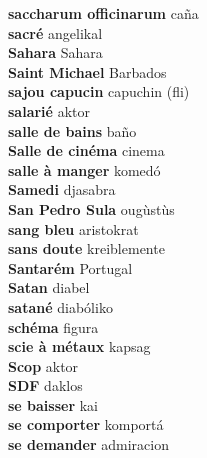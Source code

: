 \textbf{ saccharum officinarum  } caña \\
\textbf{ sacré  } angelikal \\
\textbf{ Sahara  } Sahara \\
\textbf{ Saint Michael  } Barbados \\
\textbf{ sajou capucin  } capuchin (fli) \\
\textbf{ salarié  } aktor \\
\textbf{ salle de bains  } baño \\
\textbf{ Salle de cinéma  } cinema \\
\textbf{ salle à manger  } komedó \\
\textbf{ Samedi  } djasabra \\
\textbf{ San Pedro Sula  } ougùstùs \\
\textbf{ sang bleu  } aristokrat \\
\textbf{ sans doute  } kreiblemente \\
\textbf{ Santarém  } Portugal \\
\textbf{ Satan  } diabel \\
\textbf{ satané  } diabóliko \\
\textbf{ schéma  } figura \\
\textbf{ scie à métaux  } kapsag \\
\textbf{ Scop  } aktor \\
\textbf{ SDF  } daklos \\
\textbf{ se baisser  } kai \\
\textbf{ se comporter  } komportá \\
\textbf{ se demander  } admiracion \\
